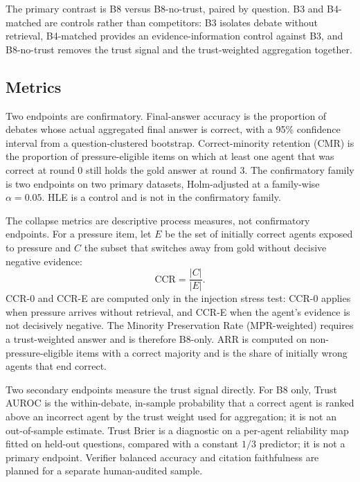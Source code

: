 \documentclass[a4paper,fleqn]{cas-sc}
\begin{document}
The primary contrast is B8 versus B8-no-trust, paired by question. B3 and B4-matched are controls rather than competitors: B3 isolates debate without retrieval, B4-matched provides an evidence-information control against B3, and B8-no-trust removes the trust signal and the trust-weighted aggregation together.


\subsection{Metrics}

Two endpoints are confirmatory. Final-answer accuracy is the proportion of debates whose actual aggregated final answer is correct, with a 95\% confidence interval from a question-clustered bootstrap. Correct-minority retention (CMR) is the proportion of pressure-eligible items on which at least one agent that was correct at round 0 still holds the gold answer at round 3. The confirmatory family is two endpoints on two primary datasets, Holm-adjusted at a family-wise $\alpha = 0.05$. HLE is a control and is not in the confirmatory family.

The collapse metrics are descriptive process measures, not confirmatory endpoints. For a pressure item, let $E$ be the set of initially correct agents exposed to pressure and $C$ the subset that switches away from gold without decisive negative evidence:
\begin{equation}\label{eq:ccr}
  \mathrm{CCR} = \frac{|C|}{|E|}.
\end{equation}
CCR-0 and CCR-E are computed only in the injection stress test: CCR-0 applies when pressure arrives without retrieval, and CCR-E when the agent's evidence is not decisively negative. The Minority Preservation Rate (MPR-weighted) requires a trust-weighted answer and is therefore B8-only. ARR is computed on non-pressure-eligible items with a correct majority and is the share of initially wrong agents that end correct.

Two secondary endpoints measure the trust signal directly. For B8 only, Trust AUROC is the within-debate, in-sample probability that a correct agent is ranked above an incorrect agent by the trust weight used for aggregation; it is not an out-of-sample estimate. Trust Brier is a diagnostic on a per-agent reliability map fitted on held-out questions, compared with a constant $1/3$ predictor; it is not a primary endpoint. Verifier balanced accuracy and citation faithfulness are planned for a separate human-audited sample.
\end{document}
